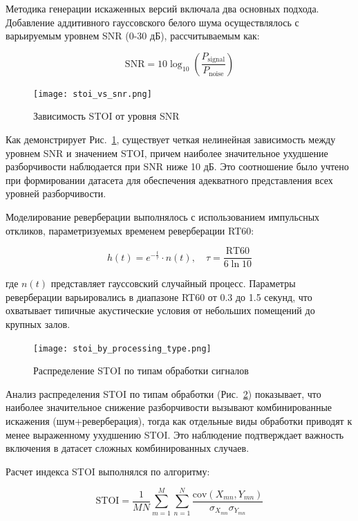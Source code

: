 \documentclass[oneside, final, 14pt]{extarticle}
\begin{document}
Методика генерации искаженных версий включала два основных подхода. Добавление аддитивного гауссовского белого шума осуществлялось с варьируемым уровнем SNR (0-30 дБ), рассчитываемым как:

\begin{equation}
	\text{SNR} = 10\log_{10}\left(\frac{P_{\text{signal}}}{P_{\text{noise}}}\right)
\end{equation}

\begin{figure}[]
	\centering
	\texttt{[image: stoi\_vs\_snr.png]}
	\caption{Зависимость STOI от уровня SNR}
	\label{fig:stoi_snr}
\end{figure}

Как демонстрирует Рис.~\ref{fig:stoi_snr}, существует четкая нелинейная зависимость между уровнем SNR и значением STOI, причем наиболее значительное ухудшение разборчивости наблюдается при SNR ниже 10 дБ. Это соотношение было учтено при формировании датасета для обеспечения адекватного представления всех уровней разборчивости.

Моделирование реверберации выполнялось с использованием импульсных откликов, параметризуемых временем реверберации RT60:

\begin{equation}
	h(t) = e^{-\frac{t}{\tau}}\cdot n(t), \quad \tau = \frac{\text{RT60}}{6\ln10}
\end{equation}

где $n(t)$ представляет гауссовский случайный процесс. Параметры реверберации варьировались в диапазоне RT60 от 0.3 до 1.5 секунд, что охватывает типичные акустические условия от небольших помещений до крупных залов.

\begin{figure}[]
	\centering
	\texttt{[image: stoi\_by\_processing\_type.png]}
	\caption{Распределение STOI по типам обработки сигналов}
	\label{fig:stoi_by_type}
\end{figure}

Анализ распределения STOI по типам обработки (Рис.~\ref{fig:stoi_by_type}) показывает, что наиболее значительное снижение разборчивости вызывают комбинированные искажения (шум+реверберация), тогда как отдельные виды обработки приводят к менее выраженному ухудшению STOI. Это наблюдение подтверждает важность включения в датасет сложных комбинированных случаев.

Расчет индекса STOI выполнялся по алгоритму:

\begin{equation}
	\text{STOI} = \frac{1}{MN}\sum_{m=1}^{M}\sum_{n=1}^{N}\frac{\text{cov}(X_{mn},Y_{mn})}{\sigma_{X_{mn}}\sigma_{Y_{mn}}}
\end{equation}
\end{document}

